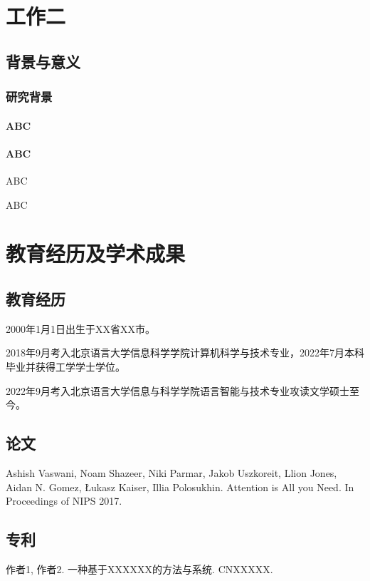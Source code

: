 \documentclass[doctor,final,oneside,continuousNum]{blcuthesis}
\begin{document}
	\chapter{工作二}
	\section{背景与意义}
	\subsection{研究背景}
	\subsubsection{ABC}
	\subsubsection{ABC}
	ABC\citet{Xie:15}
	
	ABC\citep{Xie:15}
	
	\nocite{*}
	\printbibliography[heading=bibintoc]
	
	\appendix

	\chapter{教育经历及学术成果}
	\section*{教育经历}
	2000年1月1日出生于XX省XX市。

	2018年9月考入北京语言大学信息科学学院计算机科学与技术专业，2022年7月本科毕业并获得工学学士学位。

	2022年9月考入北京语言大学信息与科学学院语言智能与技术专业攻读文学硕士至今。

	\section*{论文}
	\begin{enumerate}[label={[\arabic*]}]
		
		\item Ashish Vaswani, Noam Shazeer, Niki Parmar, Jakob Uszkoreit, Llion Jones, Aidan N. Gomez, Łukasz Kaiser, Illia Polosukhin. Attention is All you Need. In Proceedings of NIPS 2017.
	\end{enumerate}

	\section*{专利}
	\begin{enumerate}[label={[\arabic*]}]
		
		\item 作者1, 作者2. 一种基于XXXXXX的方法与系统. CNXXXXX.

	\end{enumerate}
\end{document}
